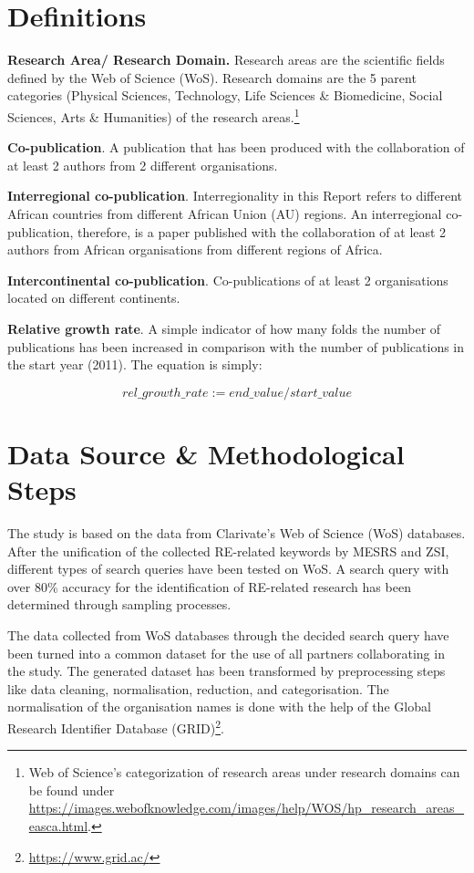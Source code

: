 \documentclass[12pt,twoside]{report}
\let\rmarkdownfootnote\footnote%
\def\footnote{\protect\rmarkdownfootnote}
\renewcommand{\href}[2]{#2\footnote{\url{#1}}}
\begin{document}
\hypertarget{definitions}{%
\section{Definitions}\label{definitions}}

\textbf{Research Area/ Research Domain.} Research areas are the scientific fields defined by the Web of Science (WoS). Research domains are the 5 parent categories (Physical Sciences, Technology, Life Sciences \& Biomedicine, Social Sciences, Arts \& Humanities) of the research areas.\footnote{Web of Science's categorization of research areas under research domains can be found under \url{https://images.webofknowledge.com/images/help/WOS/hp_research_areas_easca.html}.}

\textbf{Co-publication}. A publication that has been produced with the collaboration of at least 2 authors from 2 different organisations.

\textbf{Interregional co-publication}. Interregionality in this Report refers to different African countries from different African Union (AU) regions. An interregional co-publication, therefore, is a paper published with the collaboration of at least 2 authors from African organisations from different regions of Africa.

\textbf{Intercontinental co-publication}. Co-publications of at least 2 organisations located on different continents.

\textbf{Relative growth rate}. A simple indicator of how many folds the number of publications has been increased in comparison with the number of publications in the start year (2011). The equation is simply:

\[
rel\_growth\_rate := end\_value/start\_value
\]

\hypertarget{data-source-methodological-steps}{%
\section{Data Source \& Methodological Steps}\label{data-source-methodological-steps}}

The study is based on the data from Clarivate's Web of Science (WoS) databases. After the unification of the collected RE-related keywords by MESRS and ZSI, different types of search queries have been tested on WoS. A search query with over 80\% accuracy for the identification of RE-related research has been determined through sampling processes.

The data collected from WoS databases through the decided search query have been turned into a common dataset for the use of all partners collaborating in the study. The generated dataset has been transformed by preprocessing steps like data cleaning, normalisation, reduction, and categorisation. The normalisation of the organisation names is done with the help of the \href{https://www.grid.ac/}{Global Research Identifier Database (GRID)}.
\end{document}

